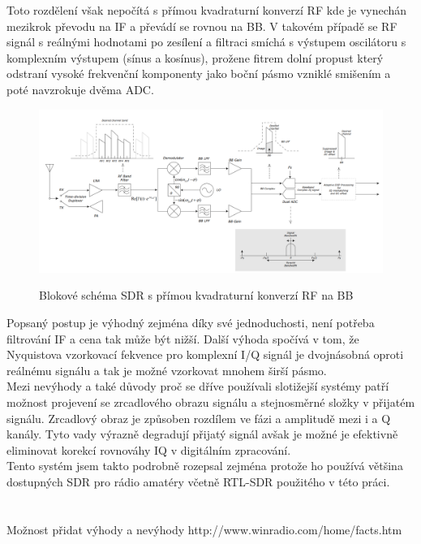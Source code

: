 \documentclass{ctuthesis}
\begin{document}
Toto rozdělení však nepočítá s přímou kvadraturní konverzí RF kde je vynechán mezikrok převodu na IF a převádí se rovnou na BB. V takovém případě se RF signál s reálnými hodnotami po zesílení a filtraci smíchá s výstupem oscilátoru s komplexním výstupem (sínus a kosínus), prožene fitrem dolní propust který odstraní vysoké frekvenční komponenty jako boční pásmo vzniklé smišením a poté navzrokuje dvěma ADC.\cite{andrásretzler2014}\\
\begin{figure}
\caption{Blokové schéma SDR s přímou kvadraturní konverzí RF na BB\cite{directdown2013}}
\includegraphics[width=1\textwidth]{./images/principSDR.png}
\label{principSDR}
\end{figure}
Popsaný postup je výhodný zejména díky své jednoduchosti, není potřeba filtrování IF a cena tak může být nižší. Další výhoda spočívá v tom, že Nyquistova vzorkovací fekvence pro komplexní I/Q signál je dvojnásobná oproti reálnému signálu a tak je možné vzorkovat mnohem širší pásmo.\\
Mezi nevýhody a také důvody proč se dříve používali slotižejší systémy patří možnost projevení se zrcadlového obrazu signálu a stejnosměrné složky v přijatém signálu. Zrcadlový obraz je způsoben rozdílem ve fázi a amplitudě mezi i a Q kanály. Tyto vady výrazně degradují přijatý signál avšak je možné je efektivně eliminovat korekcí rovnováhy IQ v digitálním zpracování.\\
Tento systém jsem takto podrobně rozepsal zejména protože ho používá většina dostupných SDR pro rádio amatéry včetně RTL-SDR použitého v této práci.
\\\\\\
Možnost přidat výhody a nevýhody http://www.winradio.com/home/facts.htm
\end{document}
